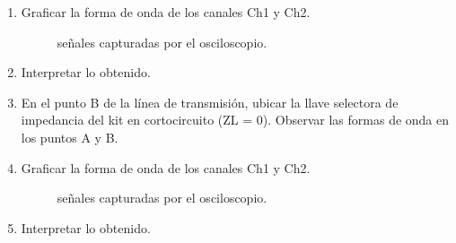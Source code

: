\begin{enumerate}
      \item Graficar la forma de onda de los canales Ch1 y Ch2.
        \begin{figure}[!ht]
          \centering
          \caption{señales capturadas por el osciloscopio.}
          \label{fig:sig_plot4}
        \end{figure}
      \item Interpretar lo obtenido.
      \item En el punto B de la línea de transmisión, ubicar la llave selectora de impedancia del kit en cortocircuito
        (ZL = 0).  Observar las formas de onda en los puntos A y B.
      \item Graficar la forma de onda de los canales Ch1 y Ch2.
        \begin{figure}[!ht]
          \centering
          \caption{señales capturadas por el osciloscopio.}
          \label{fig:sig_plot5}
        \end{figure}
      \item Interpretar lo obtenido.
    \end{enumerate}
